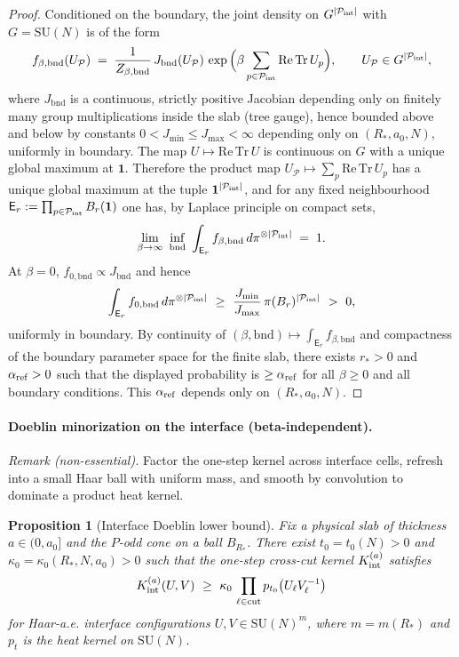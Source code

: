 \documentclass[11pt]{amsart}
\theoremstyle{plain}
\newtheorem{proposition}[theorem]{Proposition}
\theoremstyle{definition}
\theoremstyle{remark}
\begin{document}
\begin{proof}
Conditioned on the boundary, the joint density on $G^{|\mathcal P_{\rm int}|}$ with $G=\mathrm{SU}(N)$ is of the form
\[
  f_{\beta,\mathrm{bnd}}(U_{\mathcal P})\;=\;\frac{1}{Z_{\beta,\mathrm{bnd}}}\,J_{\mathrm{bnd}}(U_{\mathcal P})\,\exp\Big(\beta\sum_{p\in\mathcal P_{\rm int}} \mathrm{Re\,Tr}\,U_p\Big),\qquad U_{\mathcal P}\in G^{|\mathcal P_{\rm int}|},
\]
where $J_{\mathrm{bnd}}$ is a continuous, strictly positive Jacobian depending only on finitely many group multiplications inside the slab (tree gauge), hence bounded above and below by constants $0<J_{\min}\le J_{\max}<\infty$ depending only on $(R_*,a_0,N)$, uniformly in boundary. The map $U\mapsto \mathrm{Re\,Tr}\,U$ is continuous on $G$ with a unique global maximum at $\mathbf 1$. Therefore the product map $U_{\mathcal P}\mapsto \sum_{p}\mathrm{Re\,Tr}\,U_p$ has a unique global maximum at the tuple $\mathbf 1^{|\mathcal P_{\rm int}|}$, and for any fixed neighbourhood $\mathsf E_{r}:=\prod_{p\in\mathcal P_{\rm int}} B_r(\mathbf 1)$ one has, by Laplace principle on compact sets,
\[
  \lim_{\beta\to\infty}\ \inf_{\mathrm{bnd}}\ \int_{\mathsf E_r} f_{\beta,\mathrm{bnd}}\,d\pi^{\otimes |\mathcal P_{\rm int}|}\;=\;1.
\]
At $\beta=0$, $f_{0,\mathrm{bnd}}\propto J_{\mathrm{bnd}}$ and hence
\[
  \int_{\mathsf E_r} f_{0,\mathrm{bnd}}\,d\pi^{\otimes |\mathcal P_{\rm int}|}\ \ge\ \frac{J_{\min}}{J_{\max}}\,\pi(B_r)^{|\mathcal P_{\rm int}|}\ >\ 0,
\]
uniformly in boundary. By continuity of $(\beta,\mathrm{bnd})\mapsto \int_{\mathsf E_r} f_{\beta,\mathrm{bnd}}$ and compactness of the boundary parameter space for the finite slab, there exists $r_*>0$ and $\alpha_{\rm ref}>0$ such that the displayed probability is $\ge \alpha_{\rm ref}$ for all $\beta\ge 0$ and all boundary conditions. This $\alpha_{\rm ref}$ depends only on $(R_*,a_0,N)$.
\end{proof}

\paragraph{Doeblin minorization on the interface (beta-independent).} \emph{Remark (non-essential).} Factor the one-step kernel across interface cells, refresh into a small Haar ball with uniform mass, and smooth by convolution to dominate a product heat kernel.
\begin{proposition}[Interface Doeblin lower bound]\label{prop:doeblin-interface}
Fix a physical slab of thickness $a\in(0,a_0]$ and the $P$-odd cone on a ball $B_{R_*}$. There exist $t_0=t_0(N)>0$ and $\kappa_0=\kappa_0(R_*,N,a_0)>0$ such that the one-step cross-cut kernel $K_{\rm int}^{(a)}$ satisfies
\[
  K_{\rm int}^{(a)}(U,V)\ \ge\ \kappa_0\,\prod_{\ell\in\mathrm{cut}} p_{t_0}\big(U_\ell V_\ell^{-1}\big)
\]
for Haar-a.e. interface configurations $U,V\in \mathrm{SU}(N)^{m}$, where $m=m(R_*)$ and $p_{t}$ is the heat kernel on $\mathrm{SU}(N)$.
\end{proposition}
\end{document}
